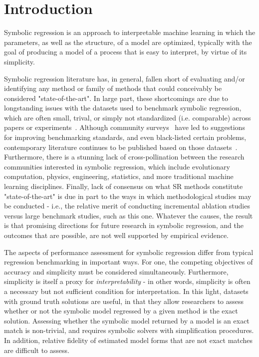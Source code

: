 
\section{Introduction}

Symbolic regression is an approach to interpretable machine learning in which the parameters, as well as the structure, of a model are optimized, typically with the goal of producing a model of a process that is easy to interpret, by virtue of its simplicity. 

Symbolic regression literature has, in general, fallen short of evaluating and/or identifying any method or family of methods that could conceivably be considered "state-of-the-art". 
In large part, these shortcomings are due to longstanding issues with the datasets used to benchmark symbolic regression, which are often small, trival, or simply not standardized (i.e. comparable) across papers or experiments~\cite{mcdermottGeneticProgrammingNeeds2012b}. 
Although community surveys~\cite{white_better_2012} have led to suggestions for improving benchmarking standards, and even black-listed certain problems, contemporary literature continues to be published based on those datasets~\cite{drucker_improving_1997}.
Furthermore, there is a stunning lack of cross-pollination between the research communities interested in symbolic regression, which include evolutionary computation, physics, engineering, statistics, and more traditional machine learning disciplines. 
Finally, lack of consensus on what SR methods constitute "state-of-the-art" is due in part to the ways in which methodological studies may be conducted - i.e., the relative merit of conducting incremental ablation studies versus large benchmark studies, such as this one. 
Whatever the causes, the result is that promising directions for future research in symbolic regression, and the outcomes that are possible, are not well supported by empirical evidence. 


The aspects of performance assessment for symbolic regression differ from typical regression benchmarking in important ways. 
For one, the competing objectives of accuracy and simplicity must be considered simultaneously.  
Furthermore, simplicity is itself a proxy for \textit{interpretability} - in other words, simplicity is often a necessary but not sufficient condition for interpretation.  
In this light, datasets with ground truth solutions are useful, in that they allow researchers to assess whether or not the symbolic model regressed by a given method is the exact solution. 
Assessing whether the symbolic model returned by a model is an exact match is non-trivial, and requires symbolic solvers with simplification procedures.
In addition, relative fidelity of estimated model forms that are not exact matches are difficult to assess.

